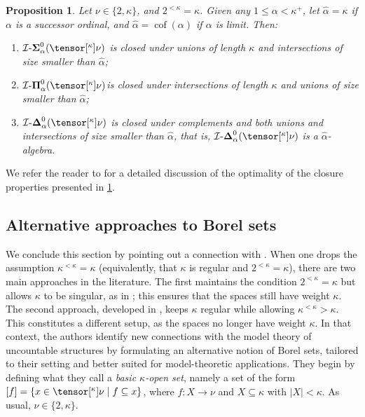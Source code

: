 \documentclass{amsart}
\numberwithin{equation}{section}
\newcommand{\I}{\mathcal{I}}
\newcommand{\pre}[2]{\tensor[^{#1}]{#2}{}}
\newcommand{\1}{\mathbf{I}}
\newcommand{\2}{\mathbf{II}}
\newcommand{\Siid}[2]{\I\text{-}\boldsymbol{\Sigma}^{ #1 }_{ #2}}
\newcommand{\Piid}[2]{\I\text{-}\boldsymbol{\Pi}^{ #1 }_{ #2 }}
\newcommand{\Deid}[2]{\I\text{-}\boldsymbol{\Delta}^{ #1 }_{ #2}}
\renewcommand{\a}{\alpha}
\renewcommand{\k}{\kappa}
\newcommand{\cof}{\operatorname{cof}}
\newtheorem{proposition}[theorem]{Proposition}
\theoremstyle{definition}
\theoremstyle{remark}
\begin{document}
\begin{proposition}\label{prop: hierarchy_closure}\cite[Proposition 4.1]{ACMRP}
Let \(\nu \in \{2,\k\}\), and $2^{<\kappa}=\kappa$. Given any \( 1 \leq \a < \k^+ \),  let \( \widehat{\alpha} = \k \) if \( \a \) is a successor ordinal, and \( \widehat{\a} = \cof(\a) \) if \( \a \) is limit. Then:
\begin{enumerate}[label={\upshape (\arabic*)}, leftmargin=2pc]
\item 
 \(\Siid{0}{\a}(\pre{\k}{\nu}) \) is closed under unions of length \(\kappa\) and intersections of size smaller than \( \widehat{\a} \);
      \item 
 \(\Piid{0}{\a}(\pre{\k}{\nu}) \)is closed under intersections of length \(\kappa\) and unions of size smaller than \( \widehat{\a} \);
      \item 
\(\Deid{0}{\a}( \pre{\k}{\nu}) \)  is closed under complements and both unions and intersections of size smaller than \( \widehat{\a} \), that is, \(\Deid{0}{\a}( \pre{\k}{\nu}) \)  is a \( \widehat{\a} \)-algebra.
      \end{enumerate} 
\end{proposition}
We refer the reader to \cite{ACMRP} for a detailed discussion of the optimality of the closure properties presented in \ref{prop: hierarchy_closure}.

\subsection{Alternative approaches to Borel sets}

We conclude this section by pointing out a connection with \cite{HMV}. 
When one drops the assumption \(\kappa^{<\kappa}=\kappa\) (equivalently, that \(\kappa\) is regular and \(2^{<\kappa}=\kappa\)), there are two main approaches in the literature. The first maintains the condition \(2^{<\kappa}=\kappa\) but allows \(\kappa\) to be singular, as in \cite{AMR, DM, ACMRP, MRP25}; this ensures that the spaces still have weight \(\kappa\). 
The second approach, developed in \cite{HMV}, keeps \(\kappa\) regular while allowing \(\kappa^{<\kappa}>\kappa\). This constitutes a different setup, as the spaces no longer have weight \(\kappa\). In that context, the authors identify new connections with the model theory of uncountable structures by formulating an alternative notion of Borel sets, tailored to their setting and better suited for model-theoretic applications.
They begin by defining what they call a \emph{basic $\k$-open set}, namely a set of the form \( [f]=\{ x \in \pre{\k}{\nu} \mid f \subseteq x \} \), where \(f \colon X \rightarrow \nu\) and \(X \subseteq \k\) with \(|X| < \k\). As usual, \(\nu \in \{2,\k\}\).
\end{document}
